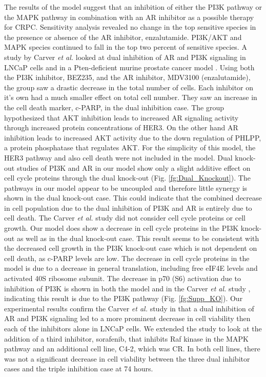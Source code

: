 \documentclass[12pt]{article}
\begin{document}
The results of the model suggest that an inhibition of either the PI3K pathway or the MAPK pathway in combination with an AR inhibitor as a possible therapy for CRPC. 
Sensitivity analysis revealed no change in the top sensitive species in the presence or absence of the AR inhibitor, enzalutamide. 
PI3K/AKT and MAPK species continued to fall in the top two percent of sensitive species. 
A study by Carver \textit{et al.} looked at dual inhibition of AR and PI3K signaling in LNCaP cells and in a Pten-deficient murine prostate cancer model \cite{Parker2013}. 
Using both the PI3K inhibitor, BEZ235, and the AR inhibitor, MDV3100 (enzalutamide), the group saw a drastic decrease in the total number of cells. 
Each inhibitor on it’s own had a much smaller effect on total cell number. They saw an increase in the cell death marker, c-PARP, in the dual inhibition case. 
The group hypothesized that AKT inhibition leads to increased AR signaling activity through increased protein concentrations of HER3. 
On the other hand AR inhibition leads to increased AKT activity due to the down regulation of PHLPP, a protein phosphatase that regulates AKT. 
For the simplicity of this model, the HER3 pathway and also cell death were not included in the model. 
Dual knock-out studies of PI3K and AR in our model show only a slight additive effect on cell cycle proteins through the dual knock-out (Fig. \ref{fg:Dual_Knockout}).
The pathways in our model appear to be uncoupled and therefore little synergy is shown in the dual knock-out case. 
This could indicate that the combined decrease in cell population due to the dual inhibition of PI3K and AR is entirely due to cell death. 
The Carver \textit{et al.} study did not consider cell cycle proteins or cell growth. 
Our model does show a decrease in cell cycle proteins in the PI3K knock-out as well as in the dual knock-out case. 
This result seems to be consistent with the decreased cell growth in the PI3K knock-out case which is not dependent on cell death, as c-PARP levels are low. 
The decrease in cell cycle proteins in the model is due to a decrease in general translation, including free eIF4E levels and activated 40S ribosome subunit. 
The decrease in p70 (S6) activation due to inhibition of PI3K is shown in both the model and in the Carver \textit{et al.} study , indicating this result is due to the PI3K pathway (Fig. \ref{fg:Supp_KO}). 
Our experimental results confirm the Carver \textit{et al.} study in that a dual inhibition of AR and PI3K signaling led to a more prominent decrease in cell viability then each of the inhibitors alone in LNCaP cells. 
We extended the study to look at the addition of a third inhibitor, sorafenib, that inhibits Raf kinase in the MAPK pathway and an additional cell line, C4-2, which was CR.  In both cell lines, there was not a significant decrease in cell viability between the three dual inhibitor cases and the triple inhibition case at 74 hours. 
\end{document}
